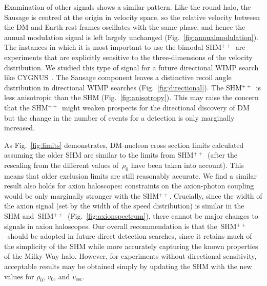 \documentclass[prd,10pt,twocolumn,showpacs,nofootinbib, aps,superscriptaddress,preprintnumbers]{revtex4-1}
\newcommand{\vesc}{v_\mathrm{esc}}
\newcommand{\SHMpp}{SHM$^{++}$}
\begin{document}
Examination of other signals shows a similar pattern. Like the round
halo, the Sausage is centred at the origin in velocity space, so the
relative velocity between the DM and Earth rest frames oscillates with
the same phase, and hence the annual modulation signal is left largely
unchanged (Fig.~\ref{fig:annualmodulation}).  The instances in which
it is most important to use the bimodal \SHMpp~are experiments that
are explicitly sensitive to the three-dimensions of the velocity
distribution. We studied this type of signal for a future directional
WIMP search like CYGNUS~\cite{CYGNUS}.  The Sausage component leaves a
distinctive recoil angle distribution in directional WIMP searches
(Fig.~\ref{fig:directional}).  The \SHMpp~is less anisotropic than the
SHM (Fig.~\ref{fig:anisotropy}).  This may raise the concern that the
\SHMpp~might weaken prospects for the directional discovery of DM but
the change in the number of events for a detection is only marginally
increased.


As Fig.~\ref{fig:limits} demonstrates, DM-nucleon cross section limits
calculated assuming the older SHM are similar to the limits from
\SHMpp~(after the rescaling from the different values of~$\rho_0$ have
been taken into account).  This means that older exclusion limits are
still reasonably accurate.  We find a similar result also holds for
axion haloscopes: constraints on the axion-photon coupling would be
only marginally stronger with the \SHMpp.  Crucially, since the width
of the axion signal (set by the width of the speed distribution) is
similar in the SHM and~\SHMpp~(Fig.~\ref{fig:axionspectrum}), there
cannot be major changes to signals in axion haloscopes.  Our overall
recommendation is that the~\SHMpp~should be adopted in future direct
detection searches, since it retains much of the simplicity of the SHM
while more accurately capturing the known properties of the Milky Way
halo. However, for experiments without directional sensitivity,
acceptable results may be obtained simply by updating the SHM with the
new values for $\rho_0$, $v_0$, and $\vesc$.
\end{document}
